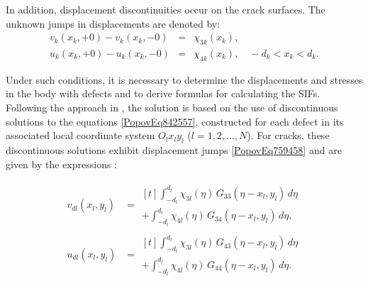 In addition, displacement discontinuities occur on the crack surfaces. The unknown jumps in displacements are denoted by:
\begin{equation} \label{PopovEq200550} 
	\begin{array}{rcl}
		v_{k}(x_{k}, +0) - v_{k}(x_{k}, -0) &=& \chi_{3k}(x_{k}),
		\\[0.5em]
		u_{k}(x_{k}, +0) - u_{k}(x_{k}, -0) &=& \chi_{4k}(x_{k}),\quad -d_{k} < x_{k} < d_{k}.  
	\end{array}
\end{equation} 

Under such conditions, it is necessary to determine the displacements and stresses in the body with defects and to derive formulas for calculating the SIFs. Following the approach in \cite{Popov14}, the solution is based on the use of discontinuous solutions to the equations \eqref{PopovEq842557}, constructed for each defect in its associated local coordinate system \( O_{l}x_{l}y_{l} \) ($l = 1, 2, \dots, N$). For cracks, these discontinuous solutions exhibit displacement jumps \eqref{PopovEq759458} and are given by the expressions \cite{Popov16}:

\begin{equation} \label{PopovEq144429} 
	\begin{aligned}
		v_{dl}(x_{l}, y_{l}) &=
		\begin{multlined}[t]
			\int_{-d_{l}}^{d_{l}} \chi_{3l}(\eta)\, G_{33}(\eta - x_{l}, y_{l})\, d\eta 
			\\[-1em]
			+ \int_{-d_{l}}^{d_{l}} \chi_{4l}(\eta)\, G_{34}(\eta - x_{l}, y_{l})\, d\eta,
		\end{multlined}
		\\
		u_{dl}(x_{l}, y_{l}) &=
		\begin{multlined}[t]
			\int_{-d_{l}}^{d_{l}} \chi_{3l}(\eta)\, G_{43}(\eta - x_{l}, y_{l})\, d\eta 
			\\
			+ \int_{-d_{l}}^{d_{l}} \chi_{4l}(\eta)\, G_{44}(\eta - x_{l}, y_{l})\, d\eta.
		\end{multlined}
	\end{aligned}
\end{equation}

